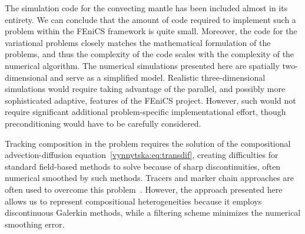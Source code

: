 The simulation code for the convecting mantle has been included almost
in its entirety. We can conclude that the amount of code required to
implement such a problem within the FEniCS framework is quite
small. Moreover, the code for the variational problems closely matches
the mathematical formulation of the problems, and thus the complexity
of the code scales with the complexity of the numerical algorithm.
The numerical simulations presented here are spatially two-dimensional
and serve as a simplified model. Realistic three-dimensional
simulations would require taking advantage of the parallel, and
possibly more sophisticated adaptive, features of the FEniCS
project. However, such would not require significant additional
problem-specific implementational effort, though preconditioning would have to
be carefully considered.

Tracking composition in the problem requires the solution of the compositional
advection-diffusion equation~\eqref{vynnytska:eq:transdif},
creating difficulties for standard field-based methods to solve
because of sharp discontinuities, often numerical smoothed by such methods.
Tracers and marker chain approaches are often used to overcome
this problem~\citep{IsmailZadehTackley2010}. However, the approach
presented here allows us to represent compositional heterogeneities
because it employs discontinuous Galerkin methods, while a filtering scheme
minimizes the numerical smoothing error.



